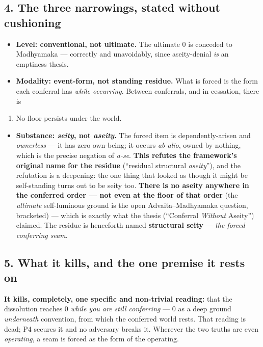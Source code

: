 \documentclass[11pt]{article}
\begin{document}
\subsection*{4. The three narrowings, stated without cushioning}

\begin{itemize}
\item \textbf{Level: conventional, not ultimate.} The ultimate 0 is conceded to Madhyamaka — correctly and unavoidably, since aseity-denial \emph{is} an emptiness thesis.
\item \textbf{Modality: event-form, not standing residue.} What is forced is the form each conferral has \emph{while occurring}. Between conferrals, and in cessation, there is
\end{itemize}

\begin{enumerate}
\item No floor persists under the world.
\end{enumerate}

\begin{itemize}
\item \textbf{Substance: \emph{seity}, not \emph{aseity}.} The forced item is dependently-arisen and \emph{ownerless} — it has zero own-being; it occurs \emph{ab alio}, owned by nothing, which is the precise negation of \emph{a-se}. \textbf{This refutes the framework's original name for the residue} (``residual structural \emph{aseity}''), and the refutation is a deepening: the one thing that looked as though it might be self-standing turns out to be seity too. \textbf{There is no aseity anywhere in the conferred order — not even at the floor of that order} (the \emph{ultimate} self-luminous ground is the open Advaita–Madhyamaka question, bracketed) — which is exactly what the thesis (``Conferral \emph{Without} Aseity'') claimed. The residue is henceforth named \textbf{structural seity} — \emph{the forced conferring seam}.
\end{itemize}

\subsection*{5. What it kills, and the one premise it rests on}

\textbf{It kills, completely, one specific and non-trivial reading:} that the dissolution reaches 0 \emph{while you are still conferring} — 0 as a deep ground \emph{underneath} convention, from which the conferred world rests. That reading is dead; P4 secures it and no adversary breaks it. Wherever the two truths are even \emph{operating}, a seam is forced as the form of the operating.
\end{document}
